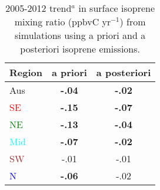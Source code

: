 \documentclass[acp, manuscript]{copernicus}
\begin{document}
      
      \begin{table}\begin{threeparttable}
        \caption{2005-2012 trend$^{a}$ in surface isoprene mixing ratio (ppbvC yr$^{-1}$) from simulations using a priori and a posteriori isoprene emissions.}
        \begin{tabular}{ l | c  c } 
          \toprule
          Region & a priori & a posteriori \\
          \midrule
          Aus                   & \textbf{-.04} & \textbf{-.02}  \\
          \textcolor{red}{SE}   & \textbf{-.15} & \textbf{-.07}  \\
          \textcolor{green}{NE} & \textbf{-.13} & \textbf{-.04}  \\
          \textcolor{cyan}{Mid} & \textbf{-.07} & \textbf{-.02}  \\
          \textcolor{brown}{SW} & -.01      & -.01  \\
          \textcolor{blue}{N}   & \textbf{-.06} & -.02  \\

\end{tabular}
\end{threeparttable}
\end{table}
\end{document}
